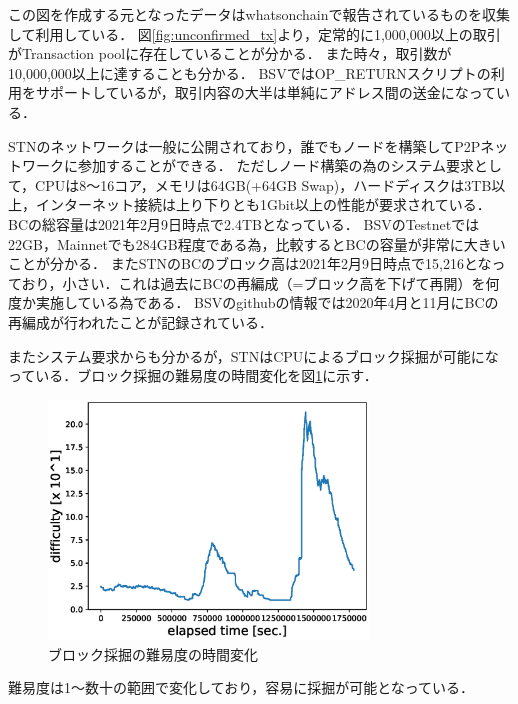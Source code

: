 \documentclass[graybox]{svmult}
\begin{document}
この図を作成する元となったデータはwhatsonchain\cite{woc}で報告されているものを収集して利用している．
図\ref{fig:unconfirmed_tx}より，定常的に1,000,000以上の取引がTransaction poolに存在していることが分かる．
また時々，取引数が10,000,000以上に達することも分かる．
BSVではOP\_RETURNスクリプトの利用をサポートしているが，取引内容の大半は単純にアドレス間の送金になっている．

STNのネットワークは一般に公開されており，誰でもノードを構築してP2Pネットワークに参加することができる．
ただしノード構築の為のシステム要求として，CPUは8〜16コア，メモリは64GB(+64GB Swap)，ハードディスクは3TB以上，インターネット接続は上り下りとも1Gbit以上の性能が要求されている．
BCの総容量は2021年2月9日時点で2.4TBとなっている．
BSVのTestnetでは22GB，Mainnetでも284GB程度である為，比較するとBCの容量が非常に大きいことが分かる．
またSTNのBCのブロック高は2021年2月9日時点で15,216となっており，小さい．これは過去にBCの再編成（=ブロック高を下げて再開）を何度か実施している為である．
BSVのgithubの情報では2020年4月と11月にBCの再編成が行われたことが記録されている．

またシステム要求からも分かるが，STNはCPUによるブロック採掘が可能になっている．ブロック採掘の難易度の時間変化を図\ref{fig:difficulty}に示す．
%
\begin{figure}[t]
  \vspace{-45mm}
  \begin{center}
    \includegraphics[width=85mm]{time_vs_difficulty-plot.eps}
  \end{center}
  \vspace{45mm}
  \caption{ブロック採掘の難易度の時間変化}
  \label{fig:difficulty}
\end{figure}
%
難易度は1〜数十の範囲で変化しており，容易に採掘が可能となっている．
\end{document}
